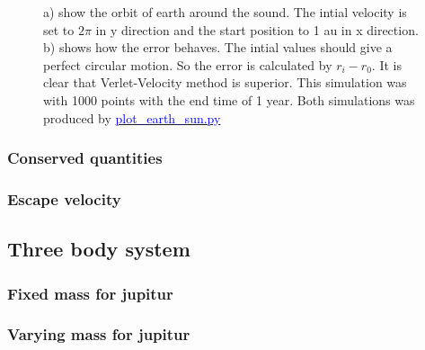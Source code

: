 \begin{figure}[H]
\begin{subfigure}{0.5\textwidth}
        \caption{}
    \end{subfigure}
    \caption{a) show the orbit of earth around the sound. The intial velocity is set to $2\pi$ in y direction and the start position to 1 au in x direction. b) shows how the error behaves. The intial values should give a perfect circular motion. So the error is calculated by $r_i - r_{0}$. It is clear that Verlet-Velocity method is superior. This simulation was with 1000 points with the end time of 1 year. Both simulations was produced by \href{https://github.com/erikfsk/Project-3/blob/master/Project3/3a/plot_earth_sun.py}{\textcolor{blue}{plot\_earth\_sun.py}}}
    \label{fig:earth-sun}
\end{figure}


\subsubsection{Conserved quantities}




\subsubsection{Escape velocity}








\subsection{Three body system}

\subsubsection{Fixed mass for jupitur}


\subsubsection{Varying mass for jupitur}




